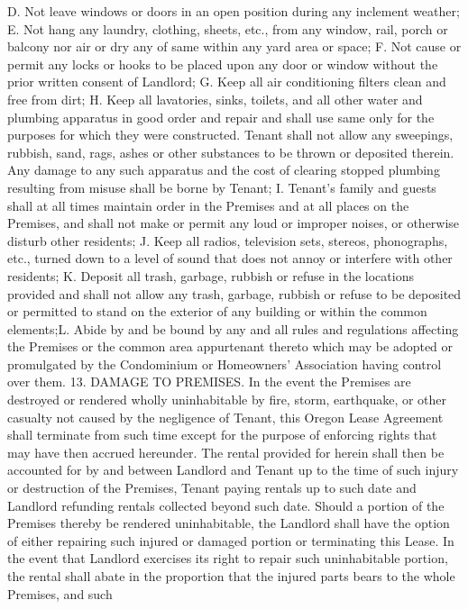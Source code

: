 D. Not leave windows or doors in an open position during any inclement weather;
E. Not hang any laundry, clothing, sheets, etc., from any window, rail, porch or balcony nor air or
dry any of same within any yard area or space;
F. Not cause or permit any locks or hooks to be placed upon any door or window without the
prior written consent of Landlord;
G. Keep all air conditioning filters clean and free from dirt;
H. Keep all lavatories, sinks, toilets, and all other water and plumbing apparatus in good order
and repair and shall use same only for the purposes for which they were constructed. Tenant
shall not allow any sweepings, rubbish, sand, rags, ashes or other substances to be thrown
or deposited therein. Any damage to any such apparatus and the cost of clearing stopped
plumbing resulting from misuse shall be borne by Tenant;
I. Tenant's family and guests shall at all times maintain order in the Premises and at all places
on the Premises, and shall not make or permit any loud or improper noises, or otherwise
disturb other residents;
J. Keep all radios, television sets, stereos, phonographs, etc., turned down to a level of sound
that does not annoy or interfere with other residents;
K. Deposit all trash, garbage, rubbish or refuse in the locations provided and shall not allow any
trash, garbage, rubbish or refuse to be deposited or permitted to stand on the exterior of any
building or within the common elements;L. Abide by and be bound by any and all rules and regulations affecting the Premises or the
common area appurtenant thereto which may be adopted or promulgated by the
Condominium or Homeowners' Association having control over them.
13. DAMAGE TO PREMISES. In the event the Premises are destroyed or rendered wholly
uninhabitable by fire, storm, earthquake, or other casualty not caused by the negligence of
Tenant, this Oregon Lease Agreement shall terminate from such time except for the purpose of
enforcing rights that may have then accrued hereunder. The rental provided for herein shall then
be accounted for by and between Landlord and Tenant up to the time of such injury or destruction
of the Premises, Tenant paying rentals up to such date and Landlord refunding rentals collected
beyond such date. Should a portion of the Premises thereby be rendered uninhabitable, the
Landlord shall have the option of either repairing such injured or damaged portion or terminating
this Lease. In the event that Landlord exercises its right to repair such uninhabitable portion, the
rental shall abate in the proportion that the injured parts bears to the whole Premises, and such
